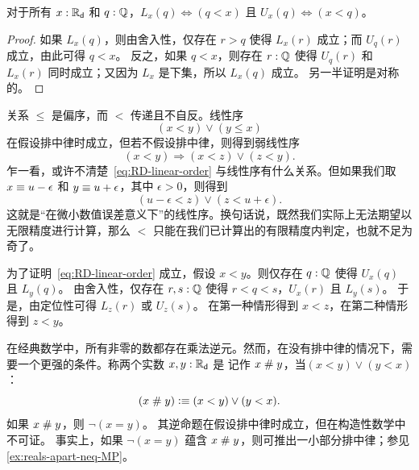 \begin{lem} \label{dedekind-in-cut-as-le}
  对于所有 $x : \mathbb{R}_\mathsf{d}$ 和 $q : \mathbb{Q}$，$L_x(q) \Leftrightarrow (q < x)$ 且 $U_x(q)
  \Leftrightarrow (x < q)$。
\end{lem}

\begin{proof}
  如果 $L_x(q)$，则由舍入性，仅存在 $r > q$ 使得 $L_x(r)$ 成立；而 $U_q(r)$ 成立，由此可得 $q < x$。
  反之，如果 $q < x$，则存在 $r : \mathbb{Q}$ 使得 $U_q(r)$ 和 $L_x(r)$ 同时成立；又因为 $L_x$ 是下集，所以 $L_x(q)$ 成立。
  另一半证明是对称的。
\end{proof}

%
关系 $\leq$ 是偏序，而 $<$ 传递且不自反。线性序
%
%
%
\begin{equation*}
  (x < y) \lor (y \leq x)
\end{equation*}
%
在假设排中律时成立，但若不假设排中律，则得到弱线性序
%
\begin{equation} \label{eq:RD-linear-order}
  (x < y) \Rightarrow (x < z) \lor (z < y).
\end{equation}
%
乍一看，或许不清楚~\eqref{eq:RD-linear-order} 与线性序有什么关系。但如果我们取 $x \equiv u - \epsilon$ 和 $y \equiv u + \epsilon$，其中 $\epsilon > 0$，则得到
%
\begin{equation*}
  (u - \epsilon < z) \lor (z < u + \epsilon).
\end{equation*}
%
这就是``在微小数值误差意义下''的线性序。换句话说，既然我们实际上无法期望以无限精度进行计算，那么 $<$ 只能在我们已计算出的有限精度内判定，也就不足为奇了。

为了证明~\eqref{eq:RD-linear-order} 成立，假设 $x < y$。则仅存在 $q : \mathbb{Q}$ 使得 $U_x(q)$ 且 $L_y(q)$。
由舍入性，仅存在 $r, s : \mathbb{Q}$ 使得 $r < q < s$，$U_x(r)$ 且 $L_y(s)$。
于是，由定位性可得 $L_z(r)$ 或 $U_z(s)$。
在第一种情形得到 $x < z$，在第二种情形得到 $z < y$。

在经典数学中，所有非零的数都存在乘法逆元。然而，在没有排中律的情况下，需要一个更强的条件。称两个实数 $x, y : \mathbb{R}_\mathsf{d}$ 是
%
记作 $x \mathrel{\#} y$，当$(x < y) \lor (y < x)$：
%
\begin{equation*}
  (x \mathrel{\#} y) \vcentcolon\equiv (x < y) \lor (y < x).
\end{equation*}
%
如果 $x \mathrel{\#} y$，则 $\lnot (x = y)$。
其逆命题在假设排中律时成立，但在构造性数学中不可证。
%
事实上，如果 $\lnot (x = y)$ 蕴含 $x \mathrel{\#} y$，则可推出一小部分排中律；参见\cref{ex:reals-apart-neq-MP}。

